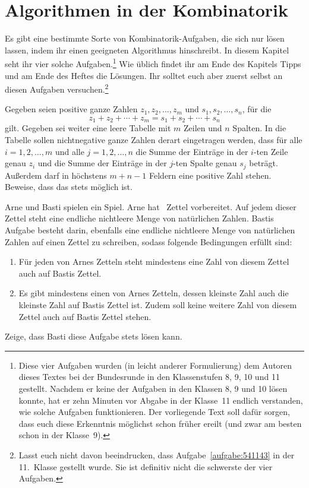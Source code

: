 \section{Algorithmen in der Kombinatorik}\label{kapitel:Algorithmen}
Es gibt eine bestimmte Sorte von Kombinatorik-Aufgaben, die sich nur lösen lassen, indem ihr einen geeigneten Algorithmus hinschreibt. In diesem Kapitel seht ihr vier solche Aufgaben.\footnote{Diese vier Aufgaben wurden (in leicht anderer Formulierung) dem Autoren dieses Textes bei der Bundesrunde in den Klassenstufen 8, 9, 10 und 11 gestellt. Nachdem er keine der Aufgaben in den Klassen 8, 9 und 10 lösen konnte, hat er zehn Minuten vor Abgabe in der Klasse~11 endlich verstanden, wie solche Aufgaben funktionieren. Der vorliegende Text soll dafür sorgen, dass euch diese Erkenntnis möglichst schon früher ereilt (und zwar am besten schon in der Klasse~9).} Wie üblich findet ihr am Ende des Kapitels Tipps und am Ende des Heftes die Lösungen. Ihr solltet euch aber zuerst selbst an diesen Aufgaben versuchen.\footnote{Lasst euch nicht davon beeindrucken, dass Aufgabe~\ref{aufgabe:541143} in der 11.\ Klasse gestellt wurde. Sie ist definitiv nicht die schwerste der vier Aufgaben.} 
\begin{aufgabe*}\label{aufgabe:510846}
	Gegeben seien positive ganze Zahlen $z_1,z_2,\dots,z_m$ und $s_1,s_2,\dotsc,s_n$, für die
	\begin{equation*}
		z_1+z_2+\dotsb+z_m=s_1+s_2+\dotsb+s_n
	\end{equation*} 
	gilt. Gegeben sei weiter eine leere Tabelle mit $m$ Zeilen und $n$ Spalten. In die Tabelle sollen nichtnegative ganze Zahlen derart eingetragen werden, dass für alle $i=1,2,\dotsc,m$ und alle $j=1,2,\dotsc,n$ die Summe der Einträge in der $i$-ten Zeile genau $z_i$ und die Summe der Einträge in der $j$-ten Spalte genau $s_j$ beträgt. Außerdem darf in höchstens $m+n-1$ Feldern eine positive Zahl stehen. Beweise, dass das stets möglich ist.
\end{aufgabe*}
\begin{aufgabe*}[*]\label{aufgabe:520945}
	Arne und Basti spielen ein Spiel. Arne hat \the\year\ Zettel vorbereitet. Auf jedem dieser Zettel steht eine endliche nichtleere Menge von natürlichen Zahlen. Bastis Aufgabe besteht darin, ebenfalls eine endliche nichtleere Menge von natürlichen Zahlen auf einen Zettel zu schreiben, sodass folgende Bedingungen erfüllt sind:
	\begin{enumerate}[label={$(\Alph*)$},ref={$(\Alph*)$}]
		\item Für jeden von Arnes Zetteln steht mindestens eine Zahl von diesem Zettel auch auf Bastis Zettel.\label{bedingung:EineZahlVonJedemZettel}
		\item Es gibt mindestens einen von Arnes Zetteln, dessen kleinste Zahl auch die kleinste Zahl auf Bastis Zettel ist. Zudem soll keine weitere Zahl von diesem Zettel auch auf Bastis Zettel stehen.\label{bedingung:KleinsteZahlVonEinemZettel}
	\end{enumerate}
	Zeige, dass Basti diese Aufgabe stets lösen kann.
\end{aufgabe*}
